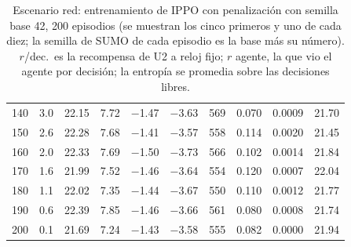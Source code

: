 \begin{table}[H]
\begin{tabular}{rrrrrrrrrr}
140 & 3.0 & 22.15 & 7.72 & $-$1.47 & $-$3.63 & 569 & 0.070 & 0.0009 & 21.70 \\
150 & 2.6 & 22.28 & 7.68 & $-$1.41 & $-$3.57 & 558 & 0.114 & 0.0020 & 21.45 \\
160 & 2.0 & 22.33 & 7.69 & $-$1.50 & $-$3.73 & 566 & 0.102 & 0.0014 & 21.84 \\
170 & 1.6 & 21.99 & 7.52 & $-$1.46 & $-$3.64 & 554 & 0.120 & 0.0007 & 22.04 \\
180 & 1.1 & 22.02 & 7.35 & $-$1.44 & $-$3.67 & 550 & 0.110 & 0.0012 & 21.77 \\
190 & 0.6 & 22.39 & 7.85 & $-$1.46 & $-$3.66 & 561 & 0.080 & 0.0008 & 21.74 \\
200 & 0.1 & 21.69 & 7.24 & $-$1.43 & $-$3.58 & 555 & 0.082 & 0.0000 & 21.94 \\
\bottomrule
\end{tabular}
\caption[Escenario red: entrenamiento de IPPO con penalización, semilla base 42]{Escenario red: entrenamiento de IPPO con penalización con semilla base 42, 200 episodios (se muestran los cinco primeros y uno de cada diez; la semilla de SUMO de cada episodio es la base más su número). $r$/dec.\ es la recompensa de U2 a reloj fijo; $r$ agente, la que vio el agente por decisión; la entropía se promedia sobre las decisiones libres.}
\label{tab:red-ippo-spill-42}
\end{table}

